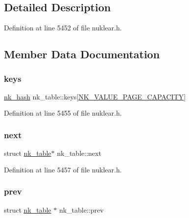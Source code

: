 \subsection{Detailed Description}


Definition at line 5452 of file nuklear.\+h.



\subsection{Member Data Documentation}
\mbox{\label{structnk__table_abe02ed8fb83c928c36e8e719d64e2cbf}} 
\subsubsection{\texorpdfstring{keys}{keys}}
{\footnotesize\ttfamily \mbox{\hyperlink{nuklear_8h_a2123e2728db7d1f136b57d6528a0d757}{nk\+\_\+hash}} nk\+\_\+table\+::keys\mbox{[}\mbox{\hyperlink{nuklear_8h_a8dc0d705f81317352b98df20a6481b52}{N\+K\+\_\+\+V\+A\+L\+U\+E\+\_\+\+P\+A\+G\+E\+\_\+\+C\+A\+P\+A\+C\+I\+TY}}\mbox{]}}



Definition at line 5455 of file nuklear.\+h.

\mbox{\label{structnk__table_a36a783e6a8874a8c0d793275d08355a4}} 
\subsubsection{\texorpdfstring{next}{next}}
{\footnotesize\ttfamily struct \mbox{\hyperlink{structnk__table}{nk\+\_\+table}}$\ast$ nk\+\_\+table\+::next}



Definition at line 5457 of file nuklear.\+h.

\mbox{\label{structnk__table_af01641e8389afdefbeb1e6a6e52dc557}} 
\subsubsection{\texorpdfstring{prev}{prev}}
{\footnotesize\ttfamily struct \mbox{\hyperlink{structnk__table}{nk\+\_\+table}} $\ast$ nk\+\_\+table\+::prev}



